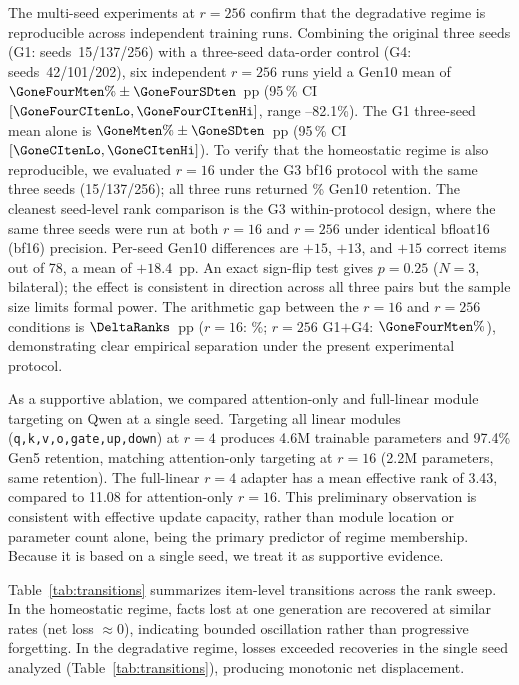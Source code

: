 \documentclass[a4paper,fleqn]{cas-dc}
\newif\ifshowchanges
\newcommand{\rev}[1]{\ifshowchanges{\color{blue}#1}\else{#1}\fi}
\begin{document}
The multi-seed experiments at $r=256$ confirm that the degradative regime is
reproducible across independent training runs.
\rev{Combining the original three seeds (G1: seeds~15/137/256) with a three-seed
data-order control (G4: seeds~42/101/202), six independent $r=256$ runs
yield a Gen10 mean of $\GoneFourMten\%\pm\GoneFourSDten$~pp
(95\,\% CI $[\GoneFourCItenLo, \GoneFourCItenHi]$, range \GoneSeedFifteenTen--82.1\%).
The G1 three-seed mean alone is $\GoneMten\%\pm\GoneSDten$~pp
(95\,\% CI $[\GoneCItenLo, \GoneCItenHi]$).}
To verify that the homeostatic regime is also reproducible, we evaluated $r=16$
under the G3 bf16 protocol with the same three seeds (15/137/256); all three runs
returned \RsixteenMten\% Gen10 retention.
\rev{The cleanest seed-level rank comparison is the G3 within-protocol design,
where the same three seeds were run at both $r=16$ and $r=256$ under identical
\rev{bfloat16 (bf16)} precision. Per-seed Gen10 differences are $+15$, $+13$, and $+15$ correct
items out of 78, a mean of $+18.4$~pp. An exact sign-flip test gives $p=0.25$
($N=3$, bilateral); the effect is consistent in direction across all three pairs
but the sample size limits formal power.}
The arithmetic gap between the $r=16$ and $r=256$ conditions is
$\DeltaRanks$~pp ($r=16$: \RsixteenMten\%; $r=256$ G1$+$G4: $\GoneFourMten\%$),
demonstrating clear empirical separation under the present experimental protocol.

As a supportive ablation, we compared attention-only and full-linear module
targeting on Qwen at a single seed. Targeting all linear modules
(\texttt{q,k,v,o,gate,up,down}) at $r=4$ produces 4.6M trainable parameters and
97.4\% Gen5 retention, matching attention-only targeting at $r=16$ (2.2M
parameters, same retention). The full-linear $r=4$ adapter has a mean effective
rank of 3.43, compared to 11.08 for attention-only $r=16$. This preliminary
observation is consistent with effective update capacity, rather than module
location or parameter count alone, being the primary predictor of regime
membership. Because it is based on a single seed, we treat it as supportive
evidence.

Table~\ref{tab:transitions} summarizes item-level transitions across the rank
sweep. In the homeostatic regime, facts lost at one generation are recovered at
similar rates (net loss $\approx 0$), indicating bounded oscillation rather than
progressive forgetting. In the degradative regime, \rev{losses exceeded recoveries in the single seed analyzed (Table~\ref{tab:transitions}), producing monotonic net displacement.}
\end{document}
